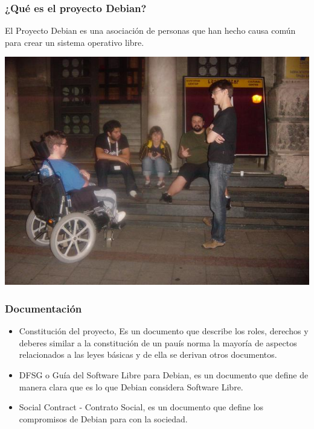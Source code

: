 \documentclass{beamer}
\begin{document}
\begin{frame}
\frametitle{¿Qu\'e es el proyecto Debian?}
        El Proyecto Debian es una asociaci\'on de personas que han hecho causa com\'un para crear un sistema operativo libre.
        \pause
        \begin{center}
                 \includegraphics[scale=0.50]{../img/debconfproject.JPG}
        \end{center}
\end{frame}

\begin{frame}
\frametitle{Documentaci\'on}
\begin{itemize}
	\pause \item Constituci\'on del proyecto, Es un documento que describe los roles, derechos y deberes similar a la constituci\'on de un pau\'is norma la 
		mayor\'ia de aspectos relacionados a las leyes b\'asicas y de ella se derivan otros documentos.
	\pause \item DFSG o Gu\'ia del Software Libre para Debian, es un documento que define de manera clara que es lo que Debian considera Software Libre.
	\pause \item Social Contract - Contrato Social, es un documento que define los compromisos de Debian para con la sociedad.
\end{itemize}
\end{frame}
\end{document}
